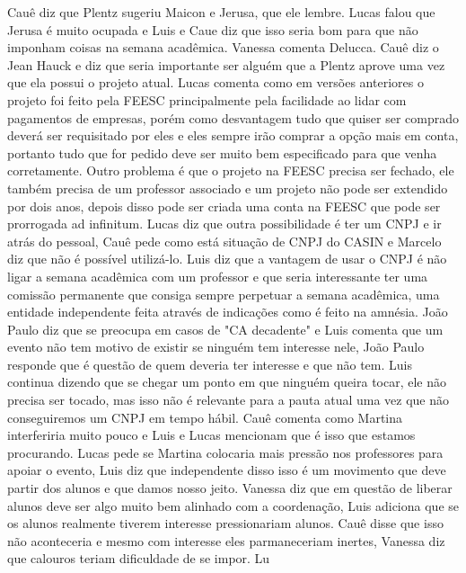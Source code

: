 \documentclass{ata-calico}
\begin{document}
Cauê diz que Plentz sugeriu Maicon e Jerusa, que ele lembre. Lucas falou que Jerusa é muito ocupada e Luis e Caue diz que isso seria bom para que não imponham coisas na semana acadêmica. Vanessa comenta Delucca. Cauê diz o Jean Hauck e diz que seria importante ser alguém que a Plentz aprove uma vez que ela possui o projeto atual. Lucas comenta como em versões anteriores o projeto foi feito pela FEESC principalmente pela facilidade ao lidar com pagamentos de empresas, porém como desvantagem tudo que quiser ser comprado deverá ser requisitado por eles e eles sempre irão comprar a opção mais em conta, portanto tudo que for pedido deve ser muito bem especificado para que venha corretamente. Outro problema é que o projeto na FEESC precisa ser fechado, ele também precisa de um professor associado e um projeto não pode ser extendido por dois anos, depois disso pode ser criada uma conta na FEESC que pode ser prorrogada ad infinitum. Lucas diz que outra possibilidade é ter um CNPJ e ir atrás do pessoal, Cauê pede como está situação de CNPJ do CASIN e Marcelo diz que não é possível utilizá-lo. Luis diz que a vantagem de usar o CNPJ é não ligar a semana acadêmica com um professor e que seria interessante ter uma comissão permanente que consiga sempre perpetuar a semana acadêmica, uma entidade independente feita através de indicações como é feito na amnésia. João Paulo diz que se preocupa em casos de "CA decadente" e Luis comenta que um evento não tem motivo de existir se ninguém tem interesse nele, João Paulo responde que é questão de quem deveria ter interesse e que não tem. Luis continua dizendo que se chegar um ponto em que ninguém queira tocar, ele não precisa ser tocado, mas isso não é relevante para a pauta atual uma vez que não conseguiremos um CNPJ em tempo hábil. Cauê comenta como Martina interferiria muito pouco e Luis e Lucas mencionam que é isso que estamos procurando. Lucas pede se Martina colocaria mais pressão nos professores para apoiar o evento, Luis diz que independente disso isso é um movimento que deve partir dos alunos e que damos nosso jeito. Vanessa diz que em questão de liberar alunos deve ser algo muito bem alinhado com a coordenação, Luis adiciona que se os alunos realmente tiverem interesse pressionariam alunos. Cauê disse que isso não aconteceria e mesmo com interesse eles parmaneceriam inertes, Vanessa diz que calouros teriam dificuldade de se impor. Lu
\end{document}
